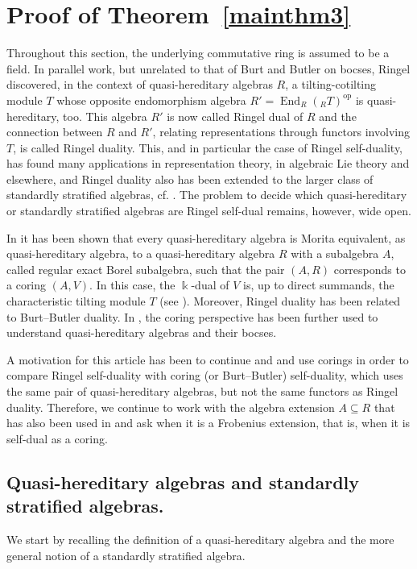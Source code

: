 \documentclass[12pt,a4paper]{amsart}
\theoremstyle{plain}
\theoremstyle{definition}
\numberwithin{equation}{thm}
\DeclareMathOperator{\End}{End}
\DeclareMathOperator{\op}{op}
\begin{document}
\section{Proof of Theorem~\ref{mainthm3}}\label{sec:proofB}
\label{sec:comparing-dualities}

Throughout this section, the underlying commutative ring is assumed to be a field. In parallel work, but unrelated to that of Burt and Butler on bocses, Ringel discovered, in the context of quasi-hereditary
algebras $R$, a tilting-cotilting module $T$ whose opposite endomorphism algebra $R'=\End_R(_R T)^{\op}$ is
quasi-hereditary, too. This algebra $R'$  is now called Ringel dual of $R$
and the connection between $R$ and $R'$, relating representations
through functors involving $T$, is
called Ringel duality. This, and in particular the case of Ringel
self-duality, has found many applications in representation theory, in
algebraic Lie theory and elsewhere, and Ringel duality also has been
extended to the larger class of standardly stratified algebras, cf. \cite{AHLU00}. The problem
to decide which quasi-hereditary or standardly stratified algebras are
Ringel self-dual remains, however, wide open.

In \cite{KKO14} it has been shown that every quasi-hereditary algebra
is Morita equivalent, as quasi-hereditary algebra, to a quasi-hereditary
algebra $R$ with a subalgebra $A$, called regular exact Borel subalgebra,
such that the pair $(A,R)$ corresponds to a coring $(A,V)$. In this case, the $\Bbbk$-dual of $V$ is, up to direct summands, the characteristic tilting module $T$ (see \cite[Proof of Theorem 11.5]{KKO14}).
Moreover, Ringel duality \cite[Section 5]{Rin91} has been related to Burt--Butler duality. In \cite{BKK20}, the coring perspective
has been further used to understand quasi-hereditary algebras and their
bocses. 

A motivation for this article has been to continue \cite{KKO14}
and \cite{BKK20} and use corings in order to compare Ringel self-duality with
coring (or Burt--Butler) self-duality, which uses the same pair of
quasi-hereditary algebras, but not the same functors as Ringel duality.
Therefore, we continue to work with the algebra extension $A \subseteq R$ that has
also been used in \cite{KKO14,BKK20} and ask when it is a Frobenius extension, that is, when it is self-dual as a
coring.

\subsection{Quasi-hereditary algebras and standardly stratified algebras.}
We start by recalling the definition of a quasi-hereditary algebra and the more general notion of a standardly stratified algebra. 
\end{document}
